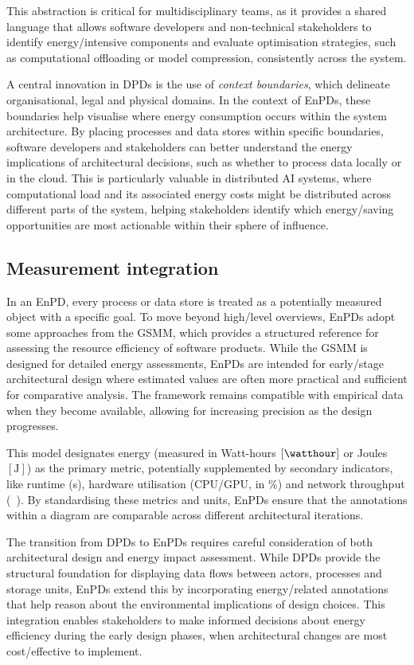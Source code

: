 \documentclass[11pt,a4paper]{article}
\begin{document}
This abstraction is critical for multidisciplinary teams, as it provides a shared language that allows software developers and non-technical stakeholders to identify energy\-/intensive components and evaluate optimisation strategies, such as computational offloading or model compression, consistently across the system.

A central innovation in DPDs is the use of \emph{context boundaries}, which delineate organisational, legal and physical domains.
In the context of EnPDs, these boundaries help visualise where energy consumption occurs within the system architecture.
By placing processes and data stores within specific boundaries, software developers and stakeholders can better understand the energy implications of architectural decisions, such as whether to process data locally or in the cloud.
This is particularly valuable in distributed AI systems, where computational load and its associated energy costs might be distributed across different parts of the system, helping stakeholders identify which energy\-/saving opportunities are most actionable within their sphere of influence.

\subsection{Measurement integration}
In an EnPD, every process or data store is treated as a potentially measured object with a specific goal.
To move beyond high\-/level overviews, EnPDs adopt some approaches from the GSMM, which provides a structured reference for assessing the resource efficiency of software products.
While the GSMM is designed for detailed energy assessments, EnPDs are intended for early\-/stage architectural design where estimated values are often more practical and sufficient for comparative analysis.
The framework remains compatible with empirical data when they become available, allowing for increasing precision as the design progresses.

This model designates energy (measured in Watt-hours $[\si{\watthour}]$ or Joules $[\si{\joule}]$) as the primary metric, potentially supplemented by secondary indicators, like runtime (\si{\second}), hardware utilisation (CPU/GPU, in \si{\percent}) and network throughput (\si{\mega\byte}).
By standardising these metrics and units, EnPDs ensure that the annotations within a diagram are comparable across different architectural iterations.

The transition from DPDs to EnPDs requires careful consideration of both architectural design and energy impact assessment.
While DPDs provide the structural foundation for displaying data flows between actors, processes and storage units, EnPDs extend this by incorporating energy\-/related annotations that help reason about the environmental implications of design choices.
This integration enables stakeholders to make informed decisions about energy efficiency during the early design phases, when architectural changes are most cost\-/effective to implement.
\end{document}
